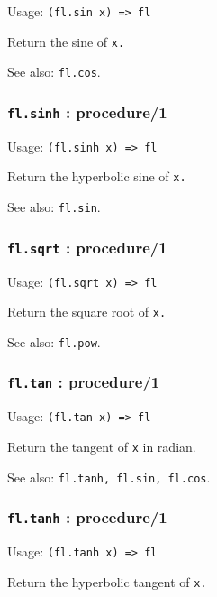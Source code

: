 \documentclass[
]{article}
\newcommand{\passthrough}[1]{#1}
\begin{document}
Usage: \passthrough{\lstinline!(fl.sin x) => fl!}

Return the sine of \passthrough{\lstinline!x.!}

See also: \passthrough{\lstinline!fl.cos!}.

\hypertarget{fl.sinh-procedure1}{%
\subsubsection{\texorpdfstring{\texttt{fl.sinh} :
procedure/1}{fl.sinh : procedure/1}}\label{fl.sinh-procedure1}}

Usage: \passthrough{\lstinline!(fl.sinh x) => fl!}

Return the hyperbolic sine of \passthrough{\lstinline!x.!}

See also: \passthrough{\lstinline!fl.sin!}.

\hypertarget{fl.sqrt-procedure1}{%
\subsubsection{\texorpdfstring{\texttt{fl.sqrt} :
procedure/1}{fl.sqrt : procedure/1}}\label{fl.sqrt-procedure1}}

Usage: \passthrough{\lstinline!(fl.sqrt x) => fl!}

Return the square root of \passthrough{\lstinline!x.!}

See also: \passthrough{\lstinline!fl.pow!}.

\hypertarget{fl.tan-procedure1}{%
\subsubsection{\texorpdfstring{\texttt{fl.tan} :
procedure/1}{fl.tan : procedure/1}}\label{fl.tan-procedure1}}

Usage: \passthrough{\lstinline!(fl.tan x) => fl!}

Return the tangent of \passthrough{\lstinline!x!} in radian.

See also: \passthrough{\lstinline!fl.tanh, fl.sin, fl.cos!}.

\hypertarget{fl.tanh-procedure1}{%
\subsubsection{\texorpdfstring{\texttt{fl.tanh} :
procedure/1}{fl.tanh : procedure/1}}\label{fl.tanh-procedure1}}

Usage: \passthrough{\lstinline!(fl.tanh x) => fl!}

Return the hyperbolic tangent of \passthrough{\lstinline!x.!}
\end{document}
